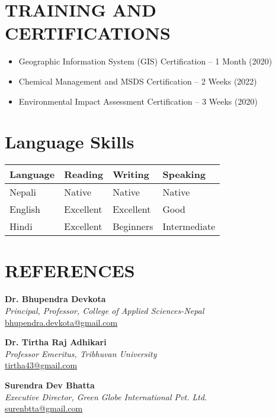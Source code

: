 \documentclass[a4paper, 11pt]{extarticle}
\begin{document}
\section*{TRAINING AND CERTIFICATIONS}
\begin{itemize}
    \item Geographic Information System (GIS) Certification – 1 Month (2020)
    \item Chemical Management and MSDS Certification – 2 Weeks (2022)
    \item Environmental Impact Assessment Certification – 3 Weeks (2020)
\end{itemize}

\section*{Language Skills}

\noindent
\begin{tabularx}{\textwidth}{|l|X|X|X|}
\hline
\textbf{Language} & \textbf{Reading} & \textbf{Writing} & \textbf{Speaking} \\ \hline
Nepali & Native & Native & Native \\ \hline
English & Excellent & Excellent & Good \\ \hline
Hindi & Excellent & Beginners & Intermediate \\ \hline
\end{tabularx}

\section*{REFERENCES}

\noindent
\textbf{Dr. Bhupendra Devkota}\\[2pt]
\textit{Principal, Professor, College of Applied Sciences-Nepal}\\
\href{mailto:bhupendra.devkota@gmail.com}{bhupendra.devkota@gmail.com}

\vspace{10pt}

\noindent
\textbf{Dr. Tirtha Raj Adhikari}\\[2pt]
\textit{Professor Emeritus, Tribhuvan University}\\
\href{mailto:tirtha43@gmail.com}{tirtha43@gmail.com}

\vspace{5pt}

\noindent
\textbf{Surendra Dev Bhatta}\\[2pt]
\textit{Executive Director, Green Globe International Pvt. Ltd.}\\
\href{mailto:surenbtta@gmail.com}{surenbtta@gmail.com}
\end{document}
